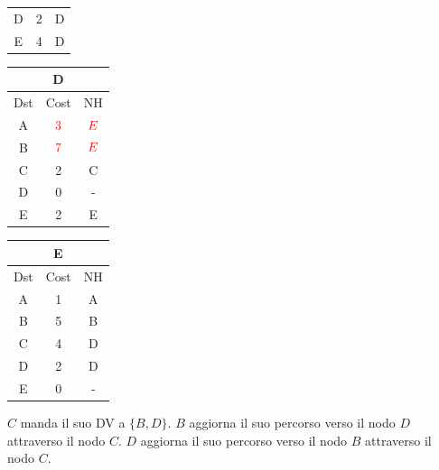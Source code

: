\documentclass[10pt]{article}
\begin{document}
\begin{table}[h!]
\begin{tabular}{|c||c||c|}
					D & 2 & D \\
					E & 4 & D \\
					\hline
				\end{tabular}
				\begin{tabular}{|c||c||c|}
					\hline
					\multicolumn{3}{|c|}{D} \\
					\hline
					Dst & Cost & NH \\
					\hline
					A & $\color{red} 3$  & $\color{red} E$ \\
					B & $\color{red} 7$  & $\color{red} E$ \\
					C & 2 & C \\
					D & 0 & - \\
					E & 2 & E \\
					\hline
				\end{tabular}
				\begin{tabular}{|c||c||c|}
					\hline
					\multicolumn{3}{|c|}{E} \\
					\hline
					Dst & Cost & NH \\
					\hline
					A & 1 & A \\
					B & 5 & B \\
					C & 4 & D \\
					D & 2 & D \\
					E & 0 & - \\
					\hline
				\end{tabular}
			\end{table}	
			\newline \newline
			$C$ manda il suo DV a $\{B,D\}$.
			\newline
			$B$ aggiorna il suo percorso verso il nodo $D$ attraverso il nodo $C$.
			\newline
			$D$ aggiorna il suo percorso verso il nodo $B$ attraverso il nodo $C$.
\end{document}
